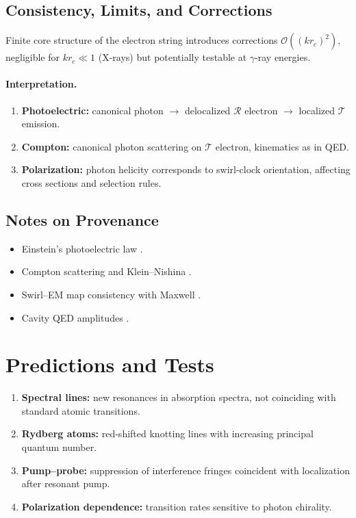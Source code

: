 \documentclass[11pt,a4paper]{article}
\begin{document}
    \subsection{Consistency, Limits, and Corrections}
    Finite core structure of the electron string introduces
    corrections $\mathcal{O}((kr_c)^2)$, negligible for
    $kr_c\ll 1$ (X-rays) but potentially testable at $\gamma$-ray energies.

    \paragraph{Interpretation.}
    \begin{enumerate}
    \item \textbf{Photoelectric:} canonical photon $\to$ delocalized $\mathcal R$ electron $\to$ localized $\mathcal T$ emission.
    \item \textbf{Compton:} canonical photon scattering on $\mathcal T$ electron, kinematics as in QED.
    \item \textbf{Polarization:} photon helicity corresponds to swirl-clock orientation, affecting cross sections and selection rules.
    \end{enumerate}

    \subsection{Notes on Provenance}
    \begin{itemize}
    \item Einstein’s photoelectric law \cite{Einstein1905,Millikan1916}.
    \item Compton scattering and Klein--Nishina \cite{Compton1923,KleinNishina1929}.
    \item Swirl--EM map consistency with Maxwell \cite{Jackson1999}.
    \item Cavity QED amplitudes \cite{HarocheRaimond2006,ScullyZubairy1997}.
    \end{itemize}



    \section{Predictions and Tests}

    \begin{enumerate}
    \item \textbf{Spectral lines:} new resonances in absorption spectra, not coinciding with standard atomic transitions.
    \item \textbf{Rydberg atoms:} red-shifted knotting lines with increasing principal quantum number.
    \item \textbf{Pump--probe:} suppression of interference fringes coincident with localization after resonant pump.
    \item \textbf{Polarization dependence:} transition rates sensitive to photon chirality.
    \end{enumerate}
\end{document}
